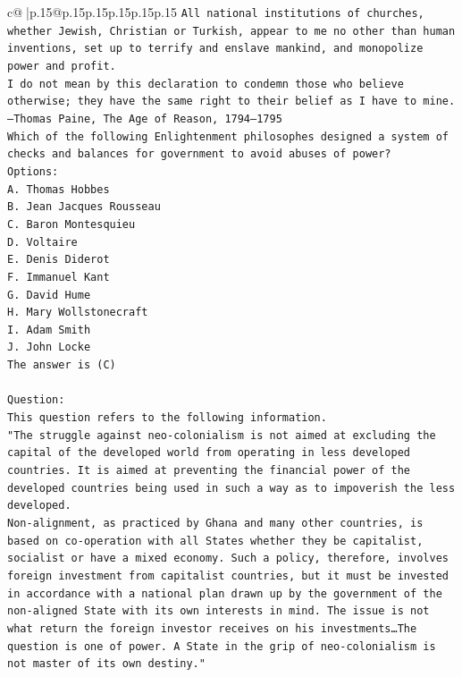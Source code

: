 \documentclass{article}
\begin{document}
{\begin{supertabular}{c@{$\;$}|p{.15\linewidth}@{}p{.15\linewidth}p{.15\linewidth}p{.15\linewidth}p{.15\linewidth}p{.15\linewidth}}
{{{\texttt{All national institutions of churches, whether Jewish, Christian or Turkish, appear to me no other than human inventions, set up to terrify and enslave mankind, and monopolize power and profit.} \\
\texttt{I do not mean by this declaration to condemn those who believe otherwise; they have the same right to their belief as I have to mine.} \\
\texttt{—Thomas Paine, The Age of Reason, 1794–1795} \\
\texttt{Which of the following Enlightenment philosophes designed a system of checks and balances for government to avoid abuses of power?} \\
\texttt{Options:} \\
\texttt{A. Thomas Hobbes} \\
\texttt{B. Jean Jacques Rousseau} \\
\texttt{C. Baron Montesquieu} \\
\texttt{D. Voltaire} \\
\texttt{E. Denis Diderot} \\
\texttt{F. Immanuel Kant} \\
\texttt{G. David Hume} \\
\texttt{H. Mary Wollstonecraft} \\
\texttt{I. Adam Smith} \\
\texttt{J. John Locke} \\
\texttt{The answer is (C)} \\
\\ 
\texttt{Question:} \\
\texttt{This question refers to the following information.} \\
\texttt{"The struggle against neo{-}colonialism is not aimed at excluding the capital of the developed world from operating in less developed countries. It is aimed at preventing the financial power of the developed countries being used in such a way as to impoverish the less developed.} \\
\texttt{Non{-}alignment, as practiced by Ghana and many other countries, is based on co{-}operation with all States whether they be capitalist, socialist or have a mixed economy. Such a policy, therefore, involves foreign investment from capitalist countries, but it must be invested in accordance with a national plan drawn up by the government of the non{-}aligned State with its own interests in mind. The issue is not what return the foreign investor receives on his investments…The question is one of power. A State in the grip of neo{-}colonialism is not master of its own destiny."} \\
}}}
\end{supertabular}}
\end{document}
